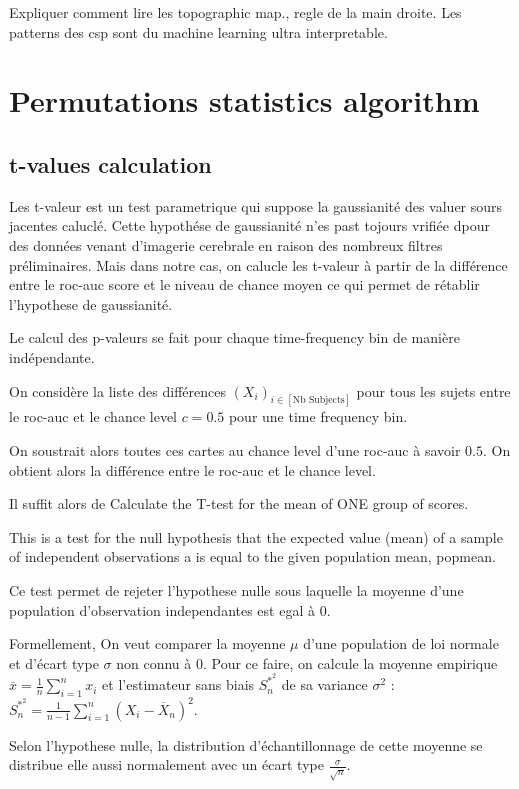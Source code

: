 Expliquer comment lire les topographic map., regle de la main droite.
Les patterns des csp sont du machine learning ultra interpretable.


\section{Permutations statistics algorithm}

\subsection{t-values calculation}

Les t-valeur est un test parametrique qui suppose la gaussianité des valuer sours jacentes caluclé. Cette hypothése de gaussianité n'es past tojours vrifiée dpour des données venant d'imagerie cerebrale en raison des nombreux filtres préliminaires. Mais dans notre cas, on calucle les t-valeur à partir de la différence entre le roc-auc score et le niveau de chance moyen ce qui permet de rétablir l'hypothese de gaussianité.

Le calcul des p-valeurs se fait pour chaque time-frequency bin de manière indépendante.

On considère la liste des différences $(X_i)_{i \in [\text{Nb Subjects}]}$ pour tous les sujets entre le roc-auc et le chance level $c=0.5$ pour une time frequency bin.

On soustrait alors toutes ces cartes au chance level d'une roc-auc à savoir $0.5$. On obtient alors la différence entre le roc-auc et le chance level.

Il suffit alors de Calculate the T-test for the mean of ONE group of scores.

This is a test for the null hypothesis that the expected value (mean) of a sample of independent observations a is equal to the given population mean, popmean.

Ce test permet de rejeter l'hypothese nulle sous laquelle la moyenne d'une population d'observation independantes est egal à $0$.

Formellement,
On veut comparer la moyenne $\mu$ d'une population de loi normale et d’écart type $\sigma$ non connu à $0$. Pour ce faire, on calcule la moyenne empirique $\overline{x} = \frac{1}{n}\sum_{i=1}^{n}x_i$ et l'estimateur  sans biais $S^{\ast ^2}_n$ de sa variance $\sigma^2$
:$S^{\ast ^2}_n = \frac{1}{n-1}\sum\limits_{i=1}^n (X_i - \overline X_n )^2$.

Selon l’hypothese nulle, la distribution d’échantillonnage de cette moyenne se distribue elle aussi normalement avec un écart type $\frac{\sigma}{\sqrt{n}}$.

